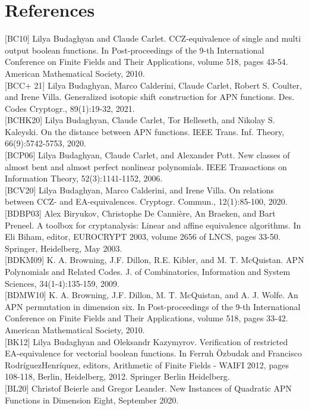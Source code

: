 \documentclass[10pt]{article}
\begin{document}
\section*{References}
[BC10] Lilya Budaghyan and Claude Carlet. CCZ-equivalence of single and multi output boolean functions. In Post-proceedings of the 9-th International Conference on Finite Fields and Their Applications, volume 518, pages 43-54. American Mathematical Society, 2010.\\[0pt]
[BCC+ 21] Lilya Budaghyan, Marco Calderini, Claude Carlet, Robert S. Coulter, and Irene Villa. Generalized isotopic shift construction for APN functions. Des. Codes Cryptogr., 89(1):19-32, 2021.\\[0pt]
[BCHK20] Lilya Budaghyan, Claude Carlet, Tor Helleseth, and Nikolay S. Kaleyski. On the distance between APN functions. IEEE Trans. Inf. Theory, 66(9):5742-5753, 2020.\\[0pt]
[BCP06] Lilya Budaghyan, Claude Carlet, and Alexander Pott. New classes of almost bent and almost perfect nonlinear polynomials. IEEE Transactions on Information Theory, 52(3):1141-1152, 2006.\\[0pt]
[BCV20] Lilya Budaghyan, Marco Calderini, and Irene Villa. On relations between CCZ- and EA-equivalences. Cryptogr. Commun., 12(1):85-100, 2020.\\[0pt]
[BDBP03] Alex Biryukov, Christophe De Cannière, An Braeken, and Bart Preneel. A toolbox for cryptanalysis: Linear and affine equivalence algorithms. In Eli Biham, editor, EUROCRYPT 2003, volume 2656 of LNCS, pages 33-50. Springer, Heidelberg, May 2003.\\[0pt]
[BDKM09] K. A. Browning, J.F. Dillon, R.E. Kibler, and M. T. McQuistan. APN Polynomials and Related Codes. J. of Combinatorics, Information and System Sciences, 34(1-4):135-159, 2009.\\[0pt]
[BDMW10] K. A. Browning, J.F. Dillon, M. T. McQuistan, and A. J. Wolfe. An APN permutation in dimension six. In Post-proceedings of the 9-th International Conference on Finite Fields and Their Applications, volume 518, pages 33-42. American Mathematical Society, 2010.\\[0pt]
[BK12] Lilya Budaghyan and Oleksandr Kazymyrov. Verification of restricted EA-equivalence for vectorial boolean functions. In Ferruh Özbudak and Francisco RodríguezHenríquez, editors, Arithmetic of Finite Fields - WAIFI 2012, pages 108-118, Berlin, Heidelberg, 2012. Springer Berlin Heidelberg.\\[0pt]
[BL20] Christof Beierle and Gregor Leander. New Instances of Quadratic APN Functions in Dimension Eight, September 2020.\\[0pt]
\end{document}
